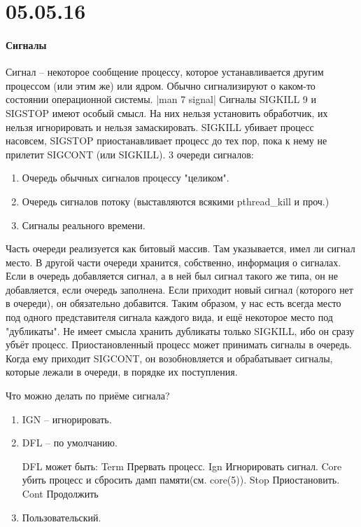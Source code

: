 \documentclass[a4paper,10pt]{article}
\begin{document}
\section{05.05.16}
\paragraph{Сигналы}
Сигнал -- некоторое сообщение процессу, которое устанавливается другим процессом (или этим же) или ядром. Обычно сигнализируют о каком-то состоянии операционной системы.
|man 7 signal|
Сигналы SIGKILL 9 и SIGSTOP имеют особый смысл. На них нельзя установить обработчик, их нельзя игнорировать и нельзя замаскировать.
SIGKILL убивает процесс насовсем, SIGSTOP приостанавливает процесс до тех пор, пока к нему не прилетит SIGCONT (или SIGKILL).
3 очереди сигналов:
\begin{enumerate}
 \item Очередь обычных сигналов процессу "целиком".
 \item Очередь сигналов потоку (выставляются всякими pthread_kill и проч.)
 \item Сигналы реального времени.
\end{enumerate}
Часть очереди реализуется как битовый массив. Там указывается, имел ли сигнал место. 
В другой части очереди хранится, собственно, информация о сигналах. Если в очередь добавляется сигнал, а в ней был сигнал такого же типа, он не добавляется, если очередь заполнена. Если приходит новый сигнал (которого нет в очереди), он обязательно добавится.
Таким образом, у нас есть всегда место под одного представителя сигнала каждого вида, и ещё некоторое место под "дубликаты".
Не имеет смысла хранить дубликаты только SIGKILL, ибо он сразу убъёт процесс.
Приостановленный процесс может принимать сигналы в очередь. Когда ему приходит SIGCONT, он возобновляется и обрабатывает сигналы, которые лежали в очереди, в порядке их поступления.

Что можно делать по приёме сигнала?
\begin{enumerate}
 \item IGN -- игнорировать.
 \item DFL -- по умолчанию.
 
DFL может быть:
Term   Прервать процесс.
Ign    Игнорировать сигнал.
Core   убить процесс и сбросить дамп памяти(см. core(5)).
Stop   Приостановить.
Cont   Продолжить
 \item Пользовательский.
\end{enumerate}
\end{document}
